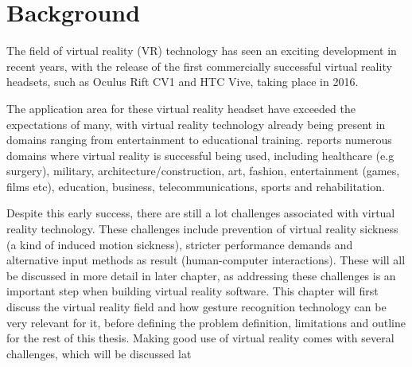 \section{Background}            
The field of virtual reality (VR) technology has seen an exciting development in recent years, 
with the release of the first commercially successful virtual reality headsets, such as Oculus Rift CV1 and HTC Vive, taking place in 2016.

The application area for these virtual reality headset have exceeded the expectations of many, with virtual reality 
technology already being present in domains ranging from entertainment to educational training\citep{VRS2016}. 
\citet{VRS2016} reports numerous domains where virtual reality is successful being used, including 
healthcare (e.g surgery), military, architecture/construction, art, fashion, entertainment (games, films etc), education, business, telecommunications, sports and rehabilitation.

Despite this early success, there are still a lot challenges associated with virtual reality technology. 
These challenges include prevention of virtual reality sickness (a kind of induced motion sickness), 
stricter performance demands and alternative input methods as result (human-computer interactions).
These will all be discussed in more detail in later chapter, as addressing these challenges is an important step when building virtual reality software.
This chapter will first discuss the virtual reality field and how gesture recognition technology can be very relevant for it,
before defining the problem definition, limitations and outline for the rest of this thesis.
Making good use of virtual reality comes with several challenges, which will be discussed lat








